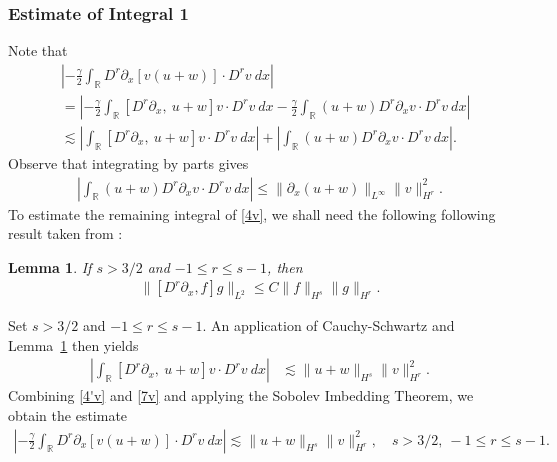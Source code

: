 \documentclass[12pt,reqno]{amsart}
\numberwithin{equation}{section}  %
\numberwithin{figure}{section}
\newcommand{\rr}{\mathbb{R}}
\newcommand{\p}{\partial}
\newtheorem{lemma}{Lemma}
\begin{document}
\subsubsection{Estimate of Integral 1} Note that
%
%
\begin{equation}
\begin{split}
& \left |  -\frac{\gamma}{2} \int_{\rr} D^r \p_x [v(u+w)] \cdot
D^r v \ dx \right |
\\
& =
\left |
-\frac{\gamma}{2} \int_{\rr} \left[ D^r \p_x, \ u+w \right]v \cdot
D^r v \ dx - \frac{\gamma}{2} \int_{\rr} (u+w) D^r
\p_x v \cdot D^r v\ dx
\right | \\
& \lesssim \left |
\int_{\rr} \left[ D^r \p_x, \ u+w \right]v \cdot
D^r v \ dx \right |
+ \left | \int_{\rr} (u+w) D^r \p_x v
\cdot D^r v\
dx \right |.
\label{4v}
\end{split}
\end{equation}
%
%
Observe that integrating by parts gives
%
%
\begin{equation}
\begin{split}
\left | \int_{\rr} (u+w) D^r \p_x v \cdot
D^r v \ dx \right |
\le \|\p_x (u+w)\|_{L^\infty}
\|v\|_{H^r}^2.
\label{4'v}
\end{split}
\end{equation}
%
%
%
%
To estimate the remaining integral of \eqref{4v}, we shall need the following
following result taken from \cite{Himonas_2009_Non-uniform-dep-per}:
%
\begin{lemma}
\label{cor1}
If $s > 3/2$ and $-1 \le r  \le s -1$, then
%
%
\begin{equation}
\begin{split}
\|[D^r \p_x ,f]g\|_{L^2} \le C \|f\|_{H^s} \|g\|_{H^r}.
\label{15}
\end{split}
\end{equation}
%
%
\end{lemma}
%
%
Set $s > 3/2$ and $-1 \le r \le s -1$. An application of 
Cauchy-Schwartz and Lemma~\ref{cor1} then yields 
%
%
\begin{equation}
\begin{split}
 \left | \int_{\rr} [D^r \p_x, \ u+w] v
\cdot D^r v \ dx \right |
& \lesssim \|u+w\|_{H^s} 
\|v\|_{H^r}^2.
\label{7v}
\end{split}
\end{equation}
%
%
Combining \eqref{4'v} and \eqref{7v} and applying the Sobolev Imbedding 
Theorem, we obtain the estimate
%
%
\begin{equation}
\begin{split}
\left |  -\frac{\gamma}{2} \int_{\rr} D^r \p_x [v(u+w)] \cdot
D^r v \ dx \right |
 \lesssim \|u+w\|_{H^s} \|v\|_{H^r}^2, \quad s > 3/2, \ -1 \le r \le s-1.
\label{8v}
\end{split}
\end{equation}
%
%
\end{document}
